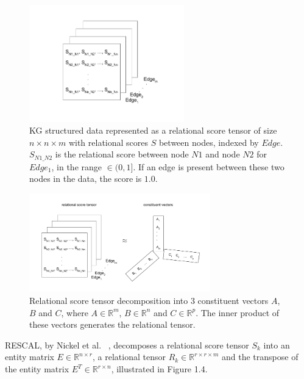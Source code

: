 \begin{figure}[H]
   	\centering
    	\includegraphics[width=0.6\textwidth, height=0.3\textheight]{relational_tensor.png}
	\captionsetup{justification=centering}
	\caption{KG structured data represented as a relational score tensor of size $ n \times n \times m $ with relational scores $ S $ between nodes, indexed by $ Edge $. $ S_{N1\_N2} $ is the relational score between node $ N1 $ and node $ N2 $ for $ Edge_1 $, in the range $ \in (0, 1] $. If an edge is present between these two nodes in the data, the score is $ 1.0 $.}
\end{figure}

\begin{figure}[H]
   	\centering
    	\includegraphics[width=0.7\textwidth, height=0.4\textwidth]{relational_tensor_decomposition}
	\captionsetup{justification=centering}
	\caption{Relational score tensor decomposition into $ 3 $ constituent vectors $ A $, $ B $ and $ C $, where $ A \in \mathbb{R}^m $,  $ B \in \mathbb{R}^n $ and $ C \in \mathbb{R}^p $. The inner product of these vectors generates the relational tensor.}
\end{figure}

\noindent RESCAL, by Nickel et al. \unskip~\citep{nickel2011three}, decomposes a relational score tensor $ S_k $ into an entity matrix $ E  \in \mathbb{R}^{n \times r} $, a relational tensor $ R_k \in \mathbb{R}^{r \times r \times m}$ and the transpose of the entity matrix $ E^T \in \mathbb{R}^{r \times n} $, illustrated in Figure 1.4. \par

